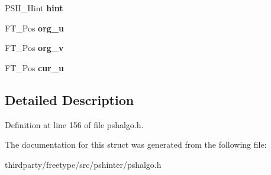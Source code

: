 \begin{DoxyCompactItemize}
P\+S\+H\+\_\+\+Hint {\bfseries hint}
\item 
\mbox{\label{struct_p_s_h___point_rec___a360fd71c553c9868575458592ef8cb40}} 
F\+T\+\_\+\+Pos {\bfseries org\+\_\+u}
\item 
\mbox{\label{struct_p_s_h___point_rec___a94acbecbc9fa199392195078878e59d1}} 
F\+T\+\_\+\+Pos {\bfseries org\+\_\+v}
\item 
\mbox{\label{struct_p_s_h___point_rec___a56b8b9f6144f07a636ad406f363abce8}} 
F\+T\+\_\+\+Pos {\bfseries cur\+\_\+u}
\end{DoxyCompactItemize}


\subsection{Detailed Description}


Definition at line 156 of file pshalgo.\+h.



The documentation for this struct was generated from the following file\+:\begin{DoxyCompactItemize}
\item 
thirdparty/freetype/src/pshinter/pshalgo.\+h\end{DoxyCompactItemize}
